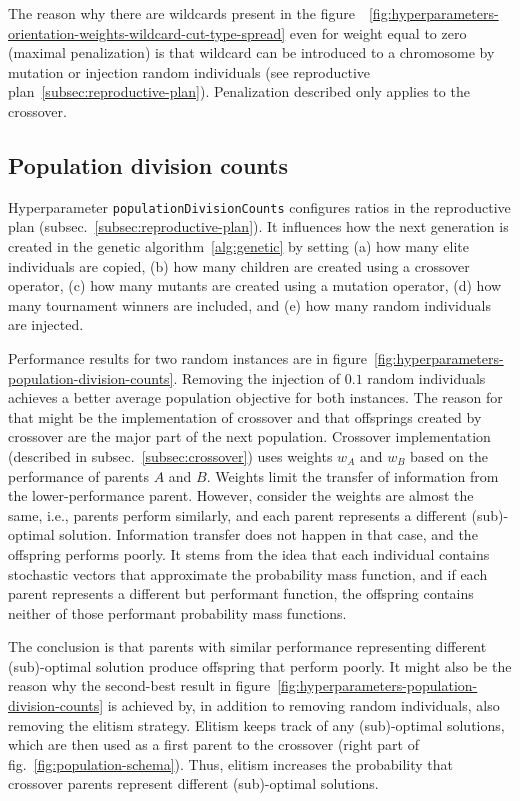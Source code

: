 The reason why there are wildcards present in the figure~~\ref{fig:hyperparameters-orientation-weights-wildcard-cut-type-spread}
even for weight equal to zero (maximal penalization) is that wildcard can be introduced to a chromosome by mutation
or injection random individuals (see reproductive plan~\ref{subsec:reproductive-plan}).
Penalization described only applies to the crossover.

\subsection{Population division counts}\label{subsec:population-division-counts}
Hyperparameter \verb|populationDivisionCounts| configures ratios in the reproductive plan (subsec.~\ref{subsec:reproductive-plan}).
It influences how the next generation is created in the genetic algorithm~\ref{alg:genetic}
by setting (a) how many elite individuals are copied, (b) how many children are created using a crossover operator,
(c) how many mutants are created using a mutation operator, (d) how many tournament winners are included,
and (e) how many random individuals are injected.

Performance results for two random instances are in figure~\ref{fig:hyperparameters-population-division-counts}.
Removing the injection of $0.1$ random individuals achieves a better average population objective for both instances.
The reason for that might be the implementation of crossover and that offsprings created by crossover
are the major part of the next population.
Crossover implementation (described in subsec.~\ref{subsec:crossover}) uses weights $w_A$ and $w_B$
based on the performance of parents $A$ and $B$.
Weights limit the transfer of information from the lower-performance parent.
However, consider the weights are almost the same, i.e., parents perform similarly, and each parent represents a different (sub)-optimal solution. Information transfer does not happen in that case, and the offspring performs poorly.
It stems from the idea that each individual contains stochastic vectors that approximate the probability mass
function, and if each parent represents a different but performant function, the offspring contains
neither of those performant probability mass functions.

The conclusion is that parents with similar performance representing different (sub)-optimal solution
produce offspring that perform poorly.
It might also be the reason why the second-best result in figure~\ref{fig:hyperparameters-population-division-counts}
is achieved by, in addition to removing random individuals, also removing the elitism strategy.
Elitism keeps track of any (sub)-optimal solutions, which are then used as a first parent
to the crossover (right part of fig.~\ref{fig:population-schema}).
Thus, elitism increases the probability that crossover parents represent different (sub)-optimal solutions.


